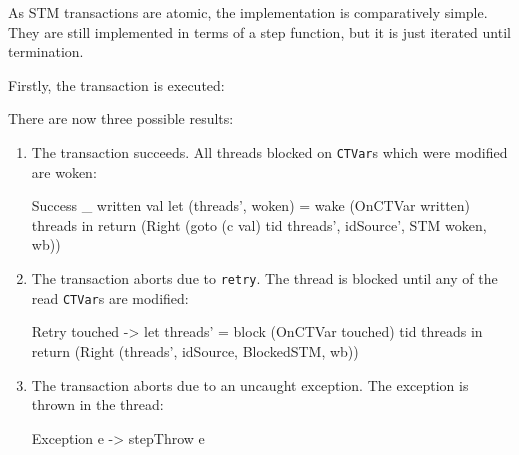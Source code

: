 As STM transactions are atomic, the implementation is comparatively
simple. They are still implemented in terms of a step function, but it
is just iterated until termination.

Firstly, the transaction is executed:


There are now three possible results:

\begin{enumerate}
\item The transaction succeeds. All threads blocked on \verb|CTVar|s
  which were modified are woken:

\begin{haskellcode}
    Success _ written val
      let (threads', woken) = wake (OnCTVar written) threads
      in return (Right (goto (c val) tid threads', idSource', STM woken, wb))
\end{haskellcode}

\item The transaction aborts due to \verb|retry|. The thread is
  blocked until any of the read \verb|CTVar|s are modified:

\begin{haskellcode}
    Retry touched ->
      let threads' = block (OnCTVar touched) tid threads
      in return (Right (threads', idSource, BlockedSTM, wb))
\end{haskellcode}

\item The transaction aborts due to an uncaught exception. The
  exception is thrown in the thread:

\begin{haskellcode}
    Exception e -> stepThrow e
\end{haskellcode}

\end{enumerate}
